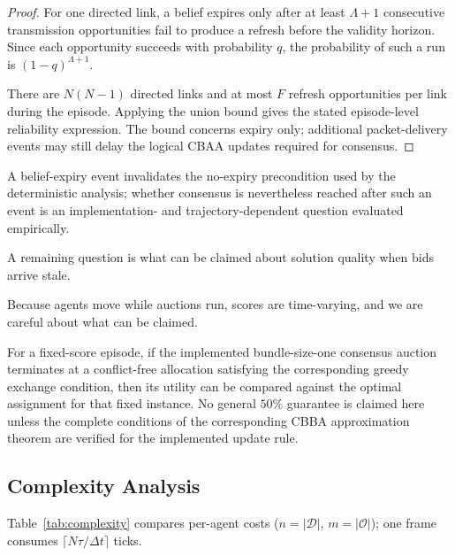 \begin{proof}
For one directed link, a belief expires only after at least
$\Lambda+1$ consecutive transmission opportunities fail to produce a
refresh before the validity horizon. Since each opportunity succeeds
with probability $q$, the probability of such a run is
$(1-q)^{\Lambda+1}$.

There are $N(N-1)$ directed links and at most $F$ refresh opportunities
per link during the episode. Applying the union bound gives the stated
episode-level reliability expression. The bound concerns expiry only;
additional packet-delivery events may still delay the logical CBAA
updates required for consensus.
\end{proof}

A belief-expiry event invalidates the no-expiry precondition used by
the deterministic analysis; whether consensus is nevertheless reached
after such an event is an implementation- and trajectory-dependent
question evaluated empirically.

A remaining question is what can be claimed about solution quality when bids arrive stale.

Because agents move while auctions run, scores are time-varying, and we are careful about what can be claimed.

\begin{proposition}
\label{prop:optimality}
For a fixed-score episode, if the implemented bundle-size-one
consensus auction terminates at a conflict-free allocation satisfying
the corresponding greedy exchange condition, then its utility can be
compared against the optimal assignment for that fixed instance. No general $50\%$ guarantee is claimed here unless the complete
conditions of the corresponding CBBA approximation theorem are
verified for the implemented update rule.

\end{proposition}

\subsection{Complexity Analysis}\label{sec:theory-complexity}
Table~\ref{tab:complexity} compares per-agent costs ($n = |\mathcal{D}|$, $m = |\mathcal{O}|$); one frame consumes $\lceil N\tau / \Delta t \rceil$ ticks.

